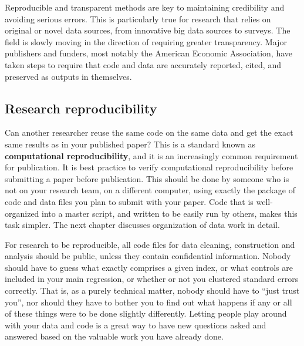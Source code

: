 Reproducible and transparent methods are key to maintaining credibility
and avoiding serious errors.
This is particularly true for research that relies on original or novel data sources,
from innovative big data sources to surveys.
The field is slowly moving in the direction of requiring greater transparency.
Major publishers and funders, most notably the American Economic Association,
have taken steps to require that code and data
are accurately reported, cited, and preserved as outputs in themselves.


\subsection{Research reproducibility}

Can another researcher reuse the same code on the same data
and get the exact same results as in your published paper?
This is a standard known as \textbf{computational reproducibility},
and it is an increasingly common requirement for publication.
It is best practice to verify computational reproducibility before submitting a paper before publication.
This should be done by someone who is not on your research team, on a different computer,
using exactly the package of code and data files you plan to submit with your paper.
Code that is well-organized into a master script, and written to be easily run by others,
makes this task simpler.
The next chapter discusses organization of data work in detail.

For research to be reproducible,
all code files for data cleaning, construction and analysis
should be public, unless they contain confidential information.
Nobody should have to guess what exactly comprises a given index,
or what controls are included in your main regression,
or whether or not you clustered standard errors correctly.
That is, as a purely technical matter, nobody should have to ``just trust you'',
nor should they have to bother you to find out what happens
if any or all of these things were to be done slightly differently.\cite{simmons2011false,simonsohn2015specification,wicherts2016degrees}
Letting people play around with your data and code
is a great way to have new questions asked and answered
based on the valuable work you have already done.

